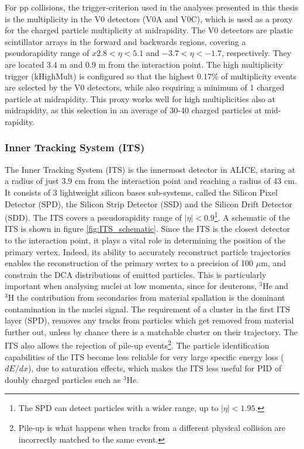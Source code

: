 For pp collisions, the trigger-criterion used in the analyses presented in this thesis is the multiplicity in the V0 detectors (V0A and V0C), which is used as a proxy for the charged particle multiplicity at midrapidity. The V0 detectors are plastic scintillator arrays in the forward and backwards regions, covering a pseudorapidity range of $x2.8<\eta<5.1$ and $-3.7<\eta<-1.7$, respectively. They are located 3.4 m and 0.9 m from the interaction point. The high multiplicity trigger (kHighMult) is configured so that the highest 0.17\% of multiplicity events are selected by the V0 detectors, while also requiring a minimum of 1 charged particle at midrapidity. This proxy works well for high multiplicities also at midrapidity, as this selection in an average of 30-40 charged particles at mid-rapidity. 

\subsubsection{Inner Tracking System (ITS)}
The Inner Tracking System (ITS) is the innermost detector in ALICE, staring at a radius of just 3.9 cm from the interaction point and reaching a radius of 43 cm. It consists of 3 lightweight silicon bases sub-systems, called the Silicon Pixel Detector (SPD), the Silicon Strip Detector (SSD) and the Silicon Drift Detector (SDD). The ITS covers a pseudorapidity range of $|\eta|<0.9$\footnote{The SPD can detect particles with a wider range, up to $|\eta|<1.95$.}. A schematic of the ITS is shown in figure \ref{fig:ITS_schematic}. Since the ITS is the closest detector to the interaction point, it plays a vital role in determining the position of the primary vertex. Indeed, its ability to accurately reconstruct particle trajectories enables the reconstruction of the primary vertex to a precision of 100 $\mu$m, and constrain the DCA distributions of emitted particles. This is particularly important when analysing nuclei at low momenta, since for deuterons, $^3\mathrm{He}$ and $^3\mathrm{H}$ the contribution from secondaries from material spallation is the dominant contamination in the nuclei signal. The requirement of a cluster in the first ITS layer (SPD), removes any tracks from particles which get removed from material further out, unless by chance there is a matchable cluster on their trajectory.  The ITS also allows the rejection of pile-up events\footnote{Pile-up is what happens when tracks from a different physical collision are incorrectly matched to the same event.}. The particle identification capabilities of the ITS become less reliable for very large specific energy loss ($dE/dx$), due to saturation effects, which makes the ITS less useful for PID of doubly charged particles such as $^3\mathrm{He}$.

